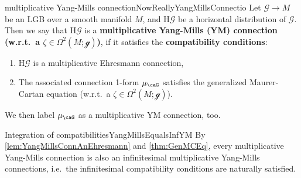 \documentclass[reqno,a4paper,oneside]{amsart}
\newcommand\mutot{\mu_\caG}
\theoremstyle{plain}
\theoremstyle{remark}
\theoremstyle{definition}
\begin{document}
\begin{definitions}{multiplicative Yang-Mills connection}{NowReallyYangMillsConnectio}
Let $\mathcal{G} \to M$ be an LGB over a smooth manifold $M$, and $\mathrm{H}\mathcal{G}$ be a horizontal distribution of $\mathcal{G}$. Then we say that $\mathrm{H}\mathcal{G}$ is a \textbf{multiplicative Yang-Mills (YM) connection (w.r.t.\ a $\zeta \in \Omega^2(M; \mathcal{g})$)}, if it satisfies the \textbf{compatibility conditions}:
\begin{enumerate}
	\item $\mathrm{H}\mathcal{G}$ is a multiplicative Ehresmann connection,
	\item The associated connection 1-form $\mutot$ satisfies the generalized Maurer-Cartan equation (w.r.t.\ a $\zeta \in \Omega^2(M; \mathcal{g})$).
\end{enumerate}
%
We then label $\mutot$ as a multiplicative YM connection, too.
\end{definitions}

\begin{remarks}{Integration of compatibilities}{YangMillsEqualsInfYM}
By \ref{lem:YangMillsConnAnEhresmann} and \ref{thm:GenMCEq}, every multiplicative Yang-Mills connection is also an infinitesimal multiplicative Yang-Mills connections, i.e.\ the infinitesimal compatibility conditions are naturally satisfied.
\end{remarks}
\end{document}
